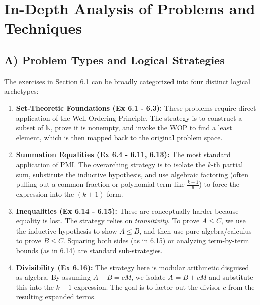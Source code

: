 \documentclass[11pt, a4paper]{article}
\theoremstyle{definition}
\theoremstyle{remark}
\newcommand{\N}{\mathbb{N}}
\begin{document}
\newpage
\section{In-Depth Analysis of Problems and Techniques}

\subsection{A) Problem Types and Logical Strategies}
The exercises in Section 6.1 can be broadly categorized into four distinct logical archetypes:
\begin{enumerate}
    \item \textbf{Set-Theoretic Foundations (Ex 6.1 - 6.3):} These problems require direct application of the Well-Ordering Principle. The strategy is to construct a subset of $\N$, prove it is nonempty, and invoke the WOP to find a least element, which is then mapped back to the original problem space.
    \item \textbf{Summation Equalities (Ex 6.4 - 6.11, 6.13):} The most standard application of PMI. The overarching strategy is to isolate the $k$-th partial sum, substitute the inductive hypothesis, and use algebraic factoring (often pulling out a common fraction or polynomial term like $\frac{k+1}{6}$) to force the expression into the $(k+1)$ form.
    \item \textbf{Inequalities (Ex 6.14 - 6.15):} These are conceptually harder because equality is lost. The strategy relies on \textit{transitivity}. To prove $A \le C$, we use the inductive hypothesis to show $A \le B$, and then use pure algebra/calculus to prove $B \le C$. Squaring both sides (as in 6.15) or analyzing term-by-term bounds (as in 6.14) are standard sub-strategies.
    \item \textbf{Divisibility (Ex 6.16):} The strategy here is modular arithmetic disguised as algebra. By assuming $A - B = cM$, we isolate $A = B + cM$ and substitute this into the $k+1$ expression. The goal is to factor out the divisor $c$ from the resulting expanded terms.
\end{enumerate}
\end{document}

